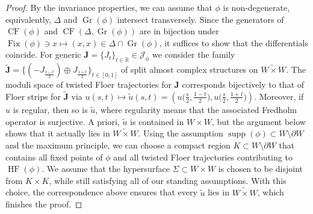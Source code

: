 \documentclass[10pt,a4paper]{amsart}
\DeclareMathOperator{\CF}{CF}
\DeclareMathOperator{\Fix}{Fix}
\DeclareMathOperator{\Gr}{Gr}
\DeclareMathOperator{\HF}{HF}
\newcommand{\R}{{\mathbb{R}}}
\newcommand{\p}{\partial}
\DeclareMathOperator{\supp}{supp}
\begin{document}
\begin{proof}
By the invariance properties, we can assume that $\phi$ is non-degenerate, equivalently, $\Delta$ and $\Gr(\phi)$ intersect transversely.
Since the generators of $\CF(\phi)$ and $\CF(\Delta,\Gr(\phi))$ are in bijection under $\Fix(\phi)\ni x\mapsto (x,x)\in \Delta\cap\Gr(\phi)$, it suffices to show that the differentials coincide.
For generic ${\bm J}=\{J_t\}_{t\in \R}\in\mathcal{J}_{\phi}$ we consider the family $\widetilde{{\bm J}}=\big\{(-J_{\frac{1-t}{2}})\oplus J_{\frac{1+t}{2}}\big\}_{t\in[0,1]}$ of split almost complex structures on $\widetilde{W\times W}$.
The moduli space of twisted Floer trajectories for ${\bm J}$ corresponds bijectively to that of Floer strips for $\widetilde{{\bm J}}$ via
$
u(s,t) \mapsto\widetilde{u}(s,t)=\left(u\big(\frac{s}{2},\frac{1-t}{2}\big),u\big(\frac{s}{2},\frac{1+t}{2}\big)\right)
$.
Moreover, if $u$ is regular, then  so is $\widetilde{u}$, where regularity means that the associated Fredholm operator is surjective.
A priori, $\widetilde{u}$ is contained in $W\times W$, but the argument below shows that it actually lies in $\widetilde{W\times W}$.
Using the assumption $\supp(\phi)\subset W\setminus \p W$ and the maximum principle, we can choose a compact region $K\subset W\setminus\p W$ that contains all fixed points of $\phi$ and all twisted Floer trajectories contributing to $\HF(\phi)$.
We assume that the hypersurface $\Sigma\subset W\times W$ is chosen to be disjoint from $K\times K$, while still satisfying all of our standing assumptions.
With this choice, the correspondence above ensures that every $\widetilde{u}$ lies in $\widetilde{W\times W}$, which finishes the proof.
\end{proof}
\end{document}
